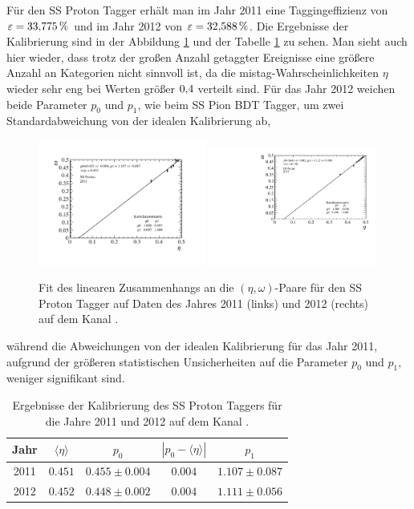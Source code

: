 Für den SS Proton Tagger erhält man im Jahr \num{2011} eine Taggingeffizienz von $\varepsilon=\SI{33{,}775}{\%}$ und im Jahr \num{2012} von $\varepsilon=\SI{32{,}588}{\%}$. Die Ergebnisse der Kalibrierung sind in der Abbildung \ref{fig:fit_SSProton} und der Tabelle \ref{tab:result_SSProton} zu sehen. Man sieht auch hier wieder, dass trotz der großen Anzahl getaggter Ereignisse eine größere Anzahl an Kategorien nicht sinnvoll ist, da die mistag-Wahrscheinlichkeiten $\eta$ wieder sehr eng bei Werten größer $\num{0{,}4}$ verteilt sind. Für das Jahr \num{2012} weichen beide Parameter $p_0$ und $p_1$, wie beim SS Pion BDT Tagger, um zwei Standardabweichung von der idealen Kalibrierung ab, 
\begin{figure}[htbp]
	\centering
		\includegraphics[width=0.49\textwidth]{fig/2011_SSProton.pdf}
		\includegraphics[width=0.49\textwidth]{fig/2012_SSProton.pdf}
	\caption{Fit des linearen Zusammenhangs an die $(\eta,\omega)$-Paare für den SS Proton Tagger auf Daten des Jahres \num{2011} (links) und \num{2012} (rechts) auf dem Kanal \BdToDpi.}
	\label{fig:fit_SSProton} 
\end{figure}
während die Abweichungen von der idealen Kalibrierung für das Jahr \num{2011}, aufgrund der größeren statistischen Unsicherheiten auf die Parameter $p_0$ und $p_1$, weniger signifikant sind.
\begin{table}[htbp]
	\centering
	\caption{Ergebnisse der Kalibrierung des SS Proton Taggers für die Jahre \num{2011} und \num{2012} auf dem Kanal \BdToDpi.}
	\label{tab:result_SSProton}
	\begin{tabular}{ccccc}
	\toprule
       Jahr & $\langle\eta\rangle$ & $p_0$ & $\left|p_0-\langle\eta\rangle\right|$ & $p_1$ \\ 
       \midrule
	2011 & $0{.}451$ & $0{.}455\pm0{.}004$ & $0{.}004$ & $1{.}107\pm0{.}087$ \\
   2012 & $0{.}452$ & $0{.}448\pm0{.}002$ & $0{.}004$ & $1{.}111\pm0{.}056$ \\ 
   \bottomrule
	\end{tabular}
\end{table}
